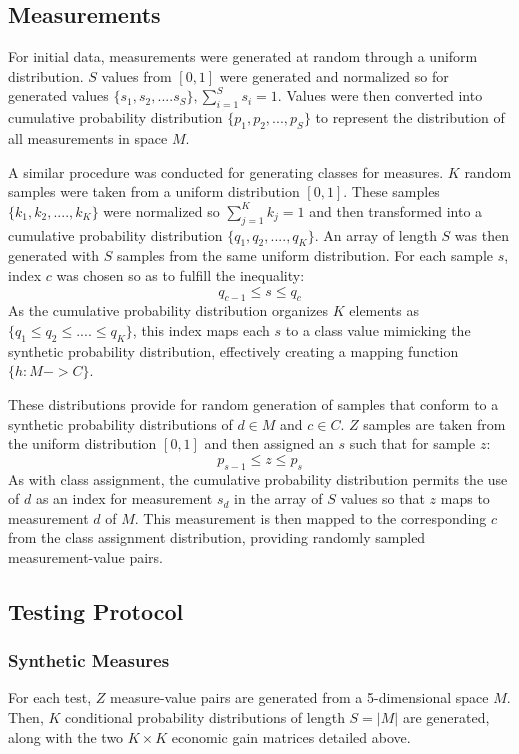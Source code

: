 \documentclass[10pt, conference]{IEEEtran}
\begin{document}
\subsection{Measurements}
For initial data, measurements were generated at random through a uniform distribution. $S$ values from $[0,1]$ were generated and normalized so for generated values $\{s_1,s_2,....s_S\}, \sum_{i=1}^Ss_i = 1$.  Values were then converted into cumulative probability distribution $\{p_1,p_2,...,p_S\}$ to represent the distribution of all measurements in space $M$. 

A similar procedure was conducted for generating classes for measures. $K$ random samples were taken from a uniform distribution $[0,1].$ These samples $\{k_1,k_2,....,k_K\}$ were normalized so $\sum_{j=1}^Kk_j=1$ and then transformed into a cumulative probability distribution $\{q_1,q_2,....,q_K\}$.  An array of length $S$ was then generated with $S$ samples from the same uniform distribution. For each sample $s$, index $c$ was chosen  so as to fulfill the inequality:
\begin{equation}
q_{c-1} \leq s \leq q_c 
\end{equation}
As the cumulative probability distribution organizes $K$ elements as $\{q_1 \leq q_2 \leq .... \leq q_K\}$, this index maps each $s$ to a class value mimicking the synthetic probability distribution, effectively creating a mapping function $\{h: M -> C\}.$

These distributions provide for random generation of samples that conform to a synthetic probability distributions of $d\in M$ and $c \in C.$ $Z$ samples are taken from the uniform distribution $[0,1]$ and then assigned an $s$ such that for sample $z$:
\begin{equation}
p_{s-1} \leq z \leq p_s 
\end{equation}
As with class assignment, the cumulative probability distribution permits the use of $d$ as an index for measurement $s_d$ in the array of $S$ values so that $z$ maps to measurement $d$ of $M$. This measurement is then mapped to the corresponding $c$ from the class assignment distribution, providing randomly sampled measurement-value pairs. 
\subsection{Testing Protocol}
\subsubsection{Synthetic Measures}
For each test, $Z$ measure-value pairs are generated from a 5-dimensional space $M.$ Then, $K$ conditional probability distributions of length $S=|M|$ are generated, along with the two $K \times K$ economic gain matrices detailed above. 
\end{document}
